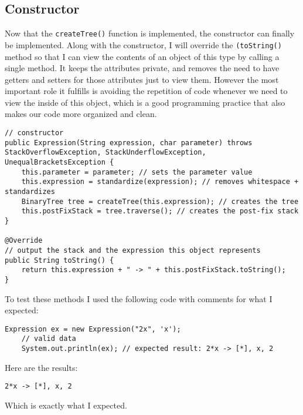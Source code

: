 \documentclass[../../../../main.tex]{subfiles}
\begin{document}
\subsection{Constructor}
Now that the \texttt{createTree()} function is implemented, the constructor can finally be implemented. Along with the constructor, I will override the \texttt{(toString()} method so that I can view the contents of an object of this type by calling a single method. It keeps the attributes private, and removes the need to have getters and setters for those attributes just to view them. However the most important role it fulfills is avoiding the repetition of code whenever we need to view the inside of this object, which is a good programming practice that also makes our code more organized and clean.

\begin{verbatim}
// constructor
public Expression(String expression, char parameter) throws StackOverflowException, StackUnderflowException, UnequalBracketsException {
	this.parameter = parameter; // sets the parameter value
	this.expression = standardize(expression); // removes whitespace + standardizes
	BinaryTree tree = createTree(this.expression); // creates the tree
	this.postFixStack = tree.traverse(); // creates the post-fix stack
}

@Override
// output the stack and the expression this object represents
public String toString() {
	return this.expression + " -> " + this.postFixStack.toString();
}
\end{verbatim}
To test these methods I used the following code with comments for what I expected:
\begin{verbatim}
Expression ex = new Expression("2x", 'x');
	// valid data
	System.out.println(ex);	// expected result: 2*x -> [*], x, 2
\end{verbatim}
Here are the results:
\begin{verbatim}
2*x -> [*], x, 2
\end{verbatim}
Which is exactly what I expected.
\newpage
\end{document}
